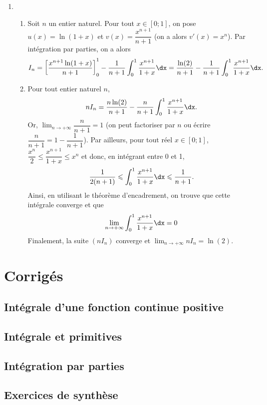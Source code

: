 \documentclass[11pt,fleqn, openany]{book} %
\begin{document}
\begin{solution}
\begin{enumerate}
\begin{enumerate}
\end{enumerate}
\item  \begin{enumerate}
\item  Soit \(n\) un entier naturel. Pour tout \(x\in [0;1]\), on pose \(u(x)=\ln(1+x)\) et \(v(x)=\dfrac{x^{n+1}}{n+1}\) (on a alors \(v'(x)=x^n\)). Par intégration par parties, on a alors
\[I_n = \left[\dfrac{x^{n+1}\ln(1+x)}{n+1}\right]_0^1-\dfrac{1}{n+1}\int_0^1\dfrac{x^{n+1}}{1+x}\dx = \dfrac{\ln(2)}{n+1}-\dfrac{1}{n+1}\int_0^1\dfrac{x^{n+1}}{1+x}\dx .\]
\item  Pour tout entier naturel \(n\),
\[nI_n = \dfrac{n\ln(2)}{n+1}-\dfrac{n}{n+1}\int_0^1\dfrac{x^{n+1}}{1+x}\dx .\] 
Or, \(\displaystyle\lim_{n \to + \infty}\dfrac{n}{n+1}=1\) (on peut factoriser par \(n\) ou écrire \(\dfrac{n}{n+1}=1-\dfrac{1}{n+1}\)). Par ailleurs, pour tout réel \(x\in [0;1]\), \(\dfrac{x^n}{2} \leqslant \dfrac{x^{n+1}}{1+x} \leqslant x^n\) et donc, en intégrant entre 0 et 1,
\[ \dfrac{1}{2(n+1)} \leqslant \int_0^1\dfrac{x^{n+1}}{1+x}\dx \leqslant \dfrac{1}{n+1}.\]
Ainsi, en utilisant le théorème d'encadrement, on trouve que cette intégrale converge et que \[\displaystyle\lim_{n \to + \infty}\int_0^1\dfrac{x^{n+1}}{1+x}\dx =0\] Finalement, la suite \((nI_n)\) converge et \(\displaystyle\lim_{n \to + \infty} nI_n=\ln(2)\).

\end{enumerate}\end{enumerate}

\end{solution}



\chapter{Corrigés}

\section*{Intégrale d'une fonction continue positive}

\printsolutions[collection={int01}, headings={false} ]

\section*{Intégrale et primitives}

\printsolutions[collection={int02}, headings={false} ]

\section*{Intégration par parties}

\printsolutions[collection={int03}, headings={false} ]

\section*{Exercices de synthèse}

\printsolutions[collection={int04}, headings={false} ]
\end{document}
